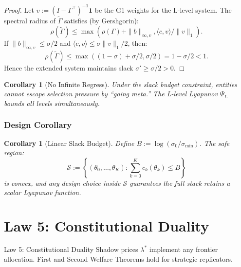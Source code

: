 \documentclass[12pt]{article}
\newtheorem{corollary}[theorem]{Corollary}
\begin{document}
\begin{proof}
Let $v := (I - \Gamma^\top)^{-1} \mathbf{1}$ be the G1 weights for the L-level system. The spectral radius of $\tilde{\Gamma}$ satisfies (by Gershgorin):
\[
\rho(\tilde{\Gamma}) \leq \max\left( \rho(\Gamma) + \|b\|_{\infty, v}, \langle c, v \rangle / \|v\|_1 \right).
\]
If $\|b\|_{\infty, v} \leq \sigma/2$ and $\langle c, v \rangle \leq \sigma \|v\|_1 / 2$, then:
\[
\rho(\tilde{\Gamma}) \leq \max\left( (1 - \sigma) + \sigma/2, \sigma/2 \right) = 1 - \sigma/2 < 1.
\]
Hence the extended system maintains slack $\sigma' \geq \sigma/2 > 0$.
\end{proof}

\begin{corollary}[No Infinite Regress]
\label{cor:no-regress}
Under the slack budget constraint, entities cannot escape selection pressure by ``going meta.'' The L-level Lyapunov $\Psi_L$ bounds all levels simultaneously.
\end{corollary}

\subsubsection{Design Corollary}

\begin{corollary}[Linear Slack Budget]
\label{cor:linear-budget}
Define $B := \log(\sigma_0 / \sigma_{\min})$. The safe region:
\[
\mathcal{S} := \left\{ (\theta_0, \ldots, \theta_K) : \sum_{k=0}^K c_k(\theta_k) \leq B \right\}
\]
is convex, and any design choice inside $\mathcal{S}$ guarantees the full stack retains a scalar Lyapunov function.
\end{corollary}




\section{Law 5: Constitutional Duality}
\label{sec:law5}

\begin{lawbox}{Law 5: Constitutional Duality}
Shadow prices $\lambda^*$ implement any frontier allocation. First and Second Welfare Theorems hold for strategic replicators.
\end{lawbox}
\end{document}
